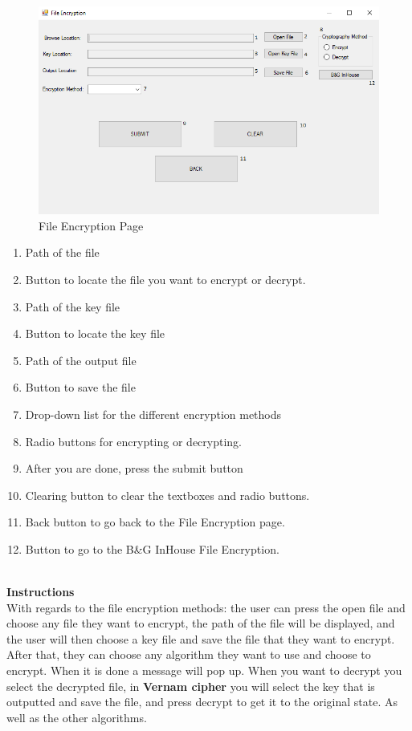 \begin{figure}[h!]
\centering
\includegraphics[scale=0.5]{Diagrams/FileEncryption.png}
\caption{File Encryption Page}
\label{fig:figure1}
\end{figure}

\begin{enumerate}
   \item Path of the file
   \item Button to locate the file you want to encrypt or decrypt.
   \item Path of the key file
   \item Button to locate the key file 
   \item Path of the output file
   \item Button to save the file 
   \item Drop-down list for the different encryption methods
   \item Radio buttons for encrypting or decrypting.
    \item After you are done, press the submit button
   \item Clearing button to clear the textboxes and radio buttons.
   \item Back button to go back to the File Encryption page.
   \item Button to go to the B\&G InHouse File Encryption.
\end{enumerate}

\textbf{\\Instructions\\}
With regards to the file encryption methods: the user can press the open file and choose any file they want to encrypt, the path of the file will be displayed, and the user will then choose a key file and  save the file that they want to encrypt. After that, they can choose any algorithm they want to use and choose to encrypt. When it is done a message will pop up. When you want to decrypt you select the decrypted file, in \textbf{Vernam cipher} you will select the key that is outputted and save the file, and press decrypt to get it to the original state. As well as the other algorithms.



